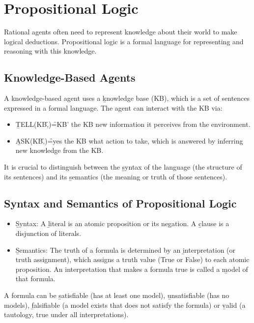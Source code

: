 \section{Propositional Logic}
Rational agents often need to represent knowledge about their world to make logical deductions. Propositional logic is a formal language for representing and reasoning with this knowledge.

\subsection{Knowledge-Based Agents}
A knowledge-based agent uses a \b{knowledge base (KB)}, which is a set of sentences expressed in a formal language. The agent can interact with the KB via:
\begin{itemize}
    \item \b{TELL(KB,\f{\alpha})\f{=}KB'} the KB new information it perceives from the environment.
    \item \b{ASK(KB,\f{\alpha})\f{=}yes} the KB what action to take, which is answered by inferring new knowledge from the KB.
\end{itemize}
It is crucial to distinguish between the \b{syntax} of the language (the structure of its sentences) and its \b{semantics} (the meaning or truth of those sentences).

\subsection{Syntax and Semantics of Propositional Logic}
\begin{itemize}
    \item \b{Syntax:} A \b{literal} is an atomic proposition or its negation. A \b{clause} is a disjunction of literals.
    \item \b{Semantics:} The truth of a formula is determined by an \b{interpretation} (or truth assignment), which assigns a truth value (True or False) to each atomic proposition. An interpretation that makes a formula true is called a \b{model} of that formula.
\end{itemize}
A formula can be \b{satisfiable} (has at least one model), \b{unsatisfiable} (has no models), \b{falsifiable} (a model exists that does not satisfy the formula) or \b{valid} (a tautology, true under all interpretations).

